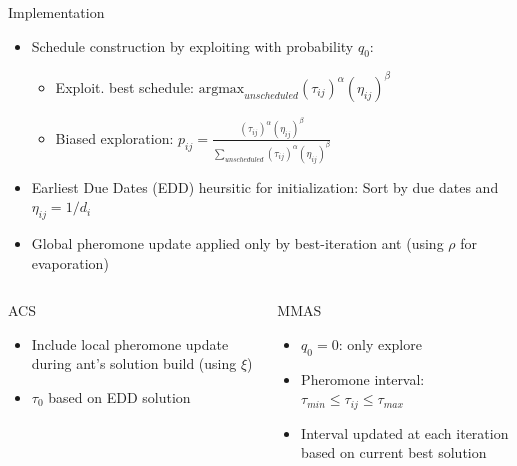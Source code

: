 \documentclass[10pt]{beamer}
\begin{document}
\begin{frame}{Implementation}{}
    \begin{itemize}
      \item Schedule construction by exploiting with probability $q_0$:
      \begin{itemize}
        \item Exploit. best schedule: $\mathrm{argmax}_{unscheduled}(\tau_{ij})^\alpha (\eta_{ij})^\beta$
        \item Biased exploration: $p_{ij} = \frac{(\tau_{ij})^\alpha (\eta_{ij})^\beta}{\sum_{unscheduled}{(\tau_{ij})^\alpha (\eta_{ij})^\beta}}$
      \end{itemize}
      \item Earliest Due Dates (EDD) heursitic for initialization: Sort by due dates and $\eta_{ij} = 1 / d_i$
      \item Global pheromone update applied only by best-iteration ant (using $\rho$ for evaporation)
    \end{itemize}
    \begin{columns}[T]
     \begin{column}{.5\textwidth}
         \begin{block}{ACS}
            \begin{itemize}
              \item Include local pheromone update during ant's solution build (using $\xi$)
              \item $\tau_0$ based on EDD solution
            \end{itemize}
         \end{block}
       \end{column}
       \begin{column}{.5\textwidth}
           \begin{block}{MMAS}
               \begin{itemize}
                   \item $q_0 = 0$: only explore
                   \item Pheromone interval: $\tau_{min} \le \tau_{ij} \le \tau_{max}$
                   \item Interval updated at each iteration based on current best solution
               \end{itemize}
           \end{block}
       \end{column}
   \end{columns}
\end{frame}
\end{document}
